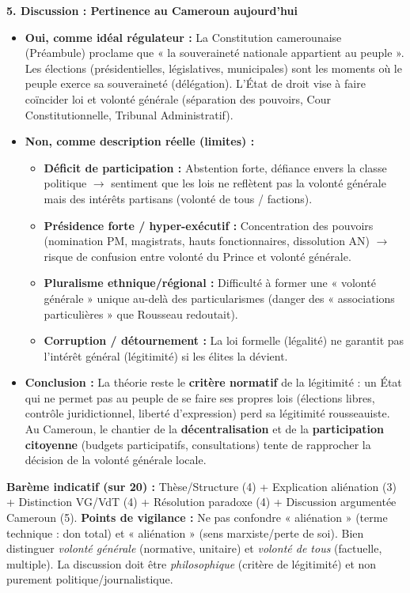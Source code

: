 \documentclass[11pt]{article}
\begin{document}
\begin{corrige}
\textbf{5. Discussion : Pertinence au Cameroun aujourd'hui}
\begin{itemize}
\item \textbf{Oui, comme idéal régulateur :} La Constitution camerounaise (Préambule) proclame que « la souveraineté nationale appartient au peuple ». Les élections (présidentielles, législatives, municipales) sont les moments où le peuple exerce sa souveraineté (délégation). L'État de droit vise à faire coïncider loi et volonté générale (séparation des pouvoirs, Cour Constitutionnelle, Tribunal Administratif).
\item \textbf{Non, comme description réelle (limites) :}
\begin{itemize}
\item \textbf{Déficit de participation :} Abstention forte, défiance envers la classe politique $\rightarrow$ sentiment que les lois ne reflètent pas la volonté générale mais des intérêts partisans (volonté de tous / factions).
\item \textbf{Présidence forte / hyper-exécutif :} Concentration des pouvoirs (nomination PM, magistrats, hauts fonctionnaires, dissolution AN) $\rightarrow$ risque de confusion entre volonté du Prince et volonté générale.
\item \textbf{Pluralisme ethnique/régional :} Difficulté à former une « volonté générale » unique au-delà des particularismes (danger des « associations particulières » que Rousseau redoutait).
\item \textbf{Corruption / détournement :} La loi formelle (légalité) ne garantit pas l'intérêt général (légitimité) si les élites la dévient.
\end{itemize}
\item \textbf{Conclusion :} La théorie reste le \textbf{critère normatif} de la légitimité : un État qui ne permet pas au peuple de se faire ses propres lois (élections libres, contrôle juridictionnel, liberté d'expression) perd sa légitimité rousseauiste. Au Cameroun, le chantier de la \textbf{décentralisation} et de la \textbf{participation citoyenne} (budgets participatifs, consultations) tente de rapprocher la décision de la volonté générale locale.
\end{itemize}

\textbf{Barème indicatif (sur 20) :} Thèse/Structure (4) + Explication aliénation (3) + Distinction VG/VdT (4) + Résolution paradoxe (4) + Discussion argumentée Cameroun (5).
\textbf{Points de vigilance :} Ne pas confondre « aliénation » (terme technique : don total) et « aliénation » (sens marxiste/perte de soi). Bien distinguer \emph{volonté générale} (normative, unitaire) et \emph{volonté de tous} (factuelle, multiple). La discussion doit être \emph{philosophique} (critère de légitimité) et non purement politique/journalistique.
\end{corrige}
\end{document}
